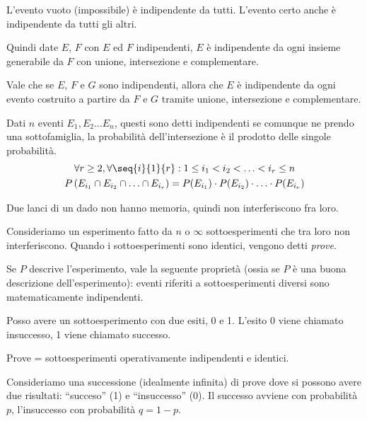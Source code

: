 L'evento vuoto (impossibile) \`e indipendente da tutti. L'evento certo anche \`e indipendente da tutti gli altri.

Quindi date $E$, $F$ con $E$ ed $F$ indipendenti, $E$ \`e indipendente da ogni insieme generabile da $F$ con unione, intersezione e complementare.

Vale che se $E$, $F$ e $G$ sono indipendenti, allora che $E$ \`e indipendente da ogni evento costruito a partire da $F$ e $G$ tramite unione, intersezione e complementare.

\begin{defn}
Dati $n$ eventi $E_1, E_2 \dots E_n$, questi sono detti indipendenti se comunque ne prendo una sottofamiglia, la probabilit\`a dell'intersezione \`e il prodotto delle singole probabilit\`a.
\begin{gather*}
\forall r \ge 2, \forall \seq{i}{1}{r} : 1 \le i_1 < i_2 < \ldots < i_r \le n \\ P \left( E_{i_1} \cap E_{i_2} \cap \ldots \cap E_{i_r} \right) = P(E_{i_1}) \cdot P(E_{i_2}) \cdot \ldots \cdot P(E_{i_r})
\end{gather*}
\end{defn}

Due lanci di un dado non hanno memoria, quindi non interferiscono fra loro.

Consideriamo un esperimento fatto da $n$ o $\infty$ sottoesperimenti che tra loro non interferiscono. Quando i sottoesperimenti sono identici, vengono detti \emph{prove}.

Se $P$ descrive l'esperimento, vale la seguente propriet\`a (ossia se $P$ \`e una buona descrizione dell'esperimento): eventi riferiti a sottoesperimenti diversi sono matematicamente indipendenti.

Posso avere un sottoesperimento con due esiti, 0 e 1. L'esito 0 viene chiamato insuccesso, 1 viene chiamato successo.

Prove = sottoesperimenti operativamente indipendenti e identici.

Consideriamo una successione (idealmente infinita) di prove dove si possono avere due risultati: ``succeso'' (1) e ``insuccesso'' (0). Il successo avviene con probabilit\`a $p$, l'insuccesso con probabilit\`a $q = 1 - p$.


